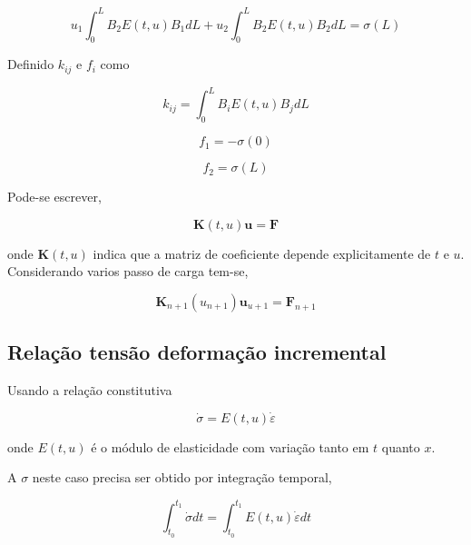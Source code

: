 \documentclass[12pt,a4paper]{article}
\newcommand{\diff}[1]{d#1}
\begin{document}
\begin{equation}
u_1 \int_0^L B_2E \left(t,u\right) B_1 \diff{L} + u_2 \int_0^L B_2E \left(t,u\right) B_2 \diff{L} = \sigma\left(L\right)
\end{equation}

Definido $k_{ij}$ e $f_i$ como

\begin{equation}
k_{ij} = \int_0^L B_iE \left(t,u\right) B_j \diff{L}
\end{equation}

\begin{equation}
f_{1} = -\sigma\left(0\right)
\end{equation}

\begin{equation}
f_{2} = \sigma\left(L\right)
\end{equation}
 
Pode-se escrever,

\begin{equation}
\mathbf{K}(t, u) \mathbf{u} = \mathbf{F}
\end{equation}

\noindent
onde $\mathbf{K}(t, u)$ indica que a matriz de coeficiente depende explicitamente de $t$ e $u$. Considerando varios passo de carga tem-se,

\begin{equation}
\mathbf{K}_{n+1}(u_{n+1}) \mathbf{u}_{u+1} = \mathbf{F}_{n+1}
\end{equation}
 
 
\subsection{Relação tensão deformação incremental}

Usando a relação constitutiva 

\begin{equation}
\dot{\sigma} = E\left(t,u\right) \dot{\varepsilon}  
\label{eq_t_defor_inc}
\end{equation}

\noindent
onde $E\left(t,u\right)$ é o módulo de elasticidade com variação tanto em $t$ quanto $x$.

A $\sigma$ neste caso precisa ser obtido por integração temporal,

\begin{equation}
\int_{t_0}^{t_1} \dot{\sigma} \diff{t} = \int_{t_0}^{t_1} E\left(t,u\right) \dot{\varepsilon} \diff{t} 
\end{equation}
\end{document}
